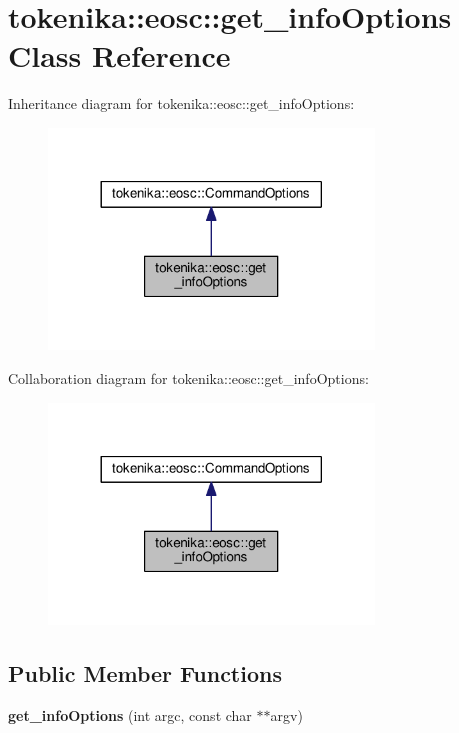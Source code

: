 \hypertarget{classtokenika_1_1eosc_1_1get__info_options}{}\section{tokenika\+:\+:eosc\+:\+:get\+\_\+info\+Options Class Reference}
\label{classtokenika_1_1eosc_1_1get__info_options}


Inheritance diagram for tokenika\+:\+:eosc\+:\+:get\+\_\+info\+Options\+:\nopagebreak
\begin{figure}[H]
\begin{center}
\leavevmode
\includegraphics[width=245pt]{classtokenika_1_1eosc_1_1get__info_options__inherit__graph}
\end{center}
\end{figure}


Collaboration diagram for tokenika\+:\+:eosc\+:\+:get\+\_\+info\+Options\+:\nopagebreak
\begin{figure}[H]
\begin{center}
\leavevmode
\includegraphics[width=245pt]{classtokenika_1_1eosc_1_1get__info_options__coll__graph}
\end{center}
\end{figure}
\subsection*{Public Member Functions}
\begin{DoxyCompactItemize}
\item 
\mbox{\label{classtokenika_1_1eosc_1_1get__info_options_a687420e26c273a029ddb83c292b5bda6}} 
{\bfseries get\+\_\+info\+Options} (int argc, const char $\ast$$\ast$argv)
\end{DoxyCompactItemize}
